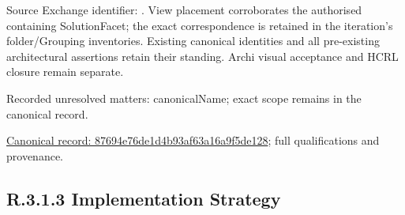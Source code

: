 Source Exchange identifier: \texttt{}. View placement corroborates
the authorised containing SolutionFacet; the exact correspondence is retained in the
iteration's folder/Grouping inventories. Existing canonical identities and all
pre-existing architectural assertions retain their standing. Archi visual
acceptance and HCRL closure remain separate.


{\small Recorded unresolved matters: canonicalName; exact scope remains in the canonical record.}\par
{\footnotesize \href{../../../../../../../continuum/grouping/87694e76de1d4b93af63a16a9f5de128.md}{Canonical record: 87694e76de1d4b93af63a16a9f5de128}; full qualifications and provenance.}\par
\subsection*{R.3.1.3 Implementation Strategy}
\label{navigation:R.3.1.3}

